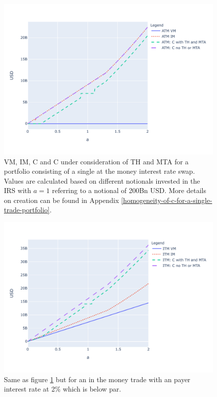 \documentclass[../Thesis_AHoecherl.tex]{subfiles}
\begin{document}
    \begin{figure}
        \centering
        \includegraphics{Graphics/C_and_its_components_for_ATM_IRS.pdf}
        \caption[Homogeneity of \gls{SA-CCR} for an at the money \gls{IRS}]{VM, IM, C and C under consideration of \gls{TH} and \gls{MTA} for a portfolio consisting of a single at the money interest rate swap. Values are calculated based on different notionals invested in the \gls{IRS} with $a=1$ referring to a notional of 200Bn USD. More details on creation can be found in Appendix \ref{homogeneity-of-c-for-a-single-trade-portfolio}.}
        \label{fig:C for ATM IRS}
    \end{figure}

    \begin{figure}
        \centering
        \includegraphics{Graphics/C_and_its_components_for_ITM_IRS.pdf}
        \caption[Homogeneity of \gls{SA-CCR} for an in the money \gls{IRS}]{Same as figure \ref{fig:C for ATM IRS} but for an in the money trade with an payer interest rate at 2\% which is below par.}
        \label{fig:C for ITM IRS}
    \end{figure}
    
\end{document}
